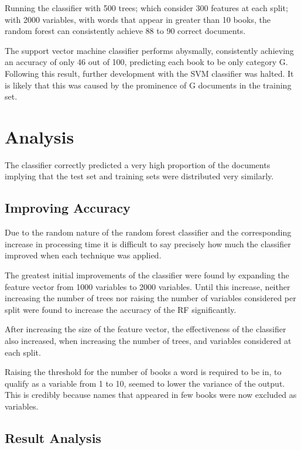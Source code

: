 \documentclass[11pt]{article}
\begin{document}
Running the classifier with 500 trees; which consider 300 features at each
split; with 2000 variables, with words that appear in greater than 10 books, the
random forest can consistently achieve 88 to 90 correct documents.

The support vector machine classifier performs abysmally, consistently achieving
an accuracy of only 46 out of 100, predicting each book to be only category G.
Following this result, further development with the SVM classifier was halted.
It is likely that this was caused by the prominence of G documents in the
training set.

\section{Analysis}

The classifier correctly predicted a very high proportion of the documents
implying that the test set and training sets were distributed very similarly.

\subsection{Improving Accuracy}

Due to the random nature of the random forest classifier and the corresponding
increase in processing time it is difficult to say precisely how much the
classifier improved when each technique was applied.

The greatest initial improvements of the classifier were found by expanding the
feature vector from 1000 variables to 2000 variables. Until this increase,
neither increasing the number of trees nor raising the number of variables
considered per split were found to increase the accuracy of the RF
significantly. 

After increasing the size of the feature vector, the effectiveness of the
classifier also increased, when increasing the number of trees, and variables
considered at each split.

Raising the threshold for the number of books a word is required to be in, to
qualify as a variable from 1 to 10, seemed to lower the variance of the output.
This is credibly because names that appeared in few books were now excluded as
variables.

\subsection{Result Analysis}
\end{document}
